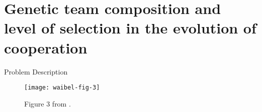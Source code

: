 \section{Genetic team composition and level of selection in the evolution of cooperation \cite{waibel2009genetic}}

\begin{frame}{Problem Description}

\begin{figure}
\texttt{[image: waibel-fig-3]}
\caption{
Figure 3 from \cite{waibel2009genetic}.
}
\end{figure}

\end{frame}
